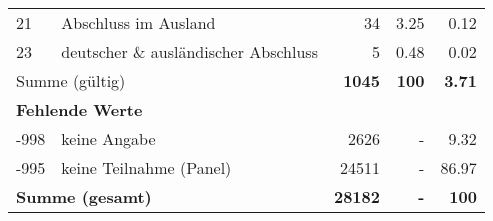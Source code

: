 \begin{longtable}{lXrrr}
     21 &
     \multicolumn{1}{X}{ Abschluss im Ausland   } &


       \num{34} &
       \num[round-mode=places,round-precision=2]{3,25} &
         \num[round-mode=places,round-precision=2]{0,12} \\

     23 &
     \multicolumn{1}{X}{ deutscher \& ausländischer Abschluss   } &


       \num{5} &
       \num[round-mode=places,round-precision=2]{0,48} &
         \num[round-mode=places,round-precision=2]{0,02} \\
     \midrule
     \multicolumn{2}{l}{Summe (gültig)} &
       \textbf{\num{1045}} &
     \textbf{100} &
       \textbf{\num[round-mode=places,round-precision=2]{3,71}} \\
     \multicolumn{5}{l}{\textbf{Fehlende Werte}}\\
       -998 &
       keine Angabe &
         \num{2626} &
        - &
         \num[round-mode=places,round-precision=2]{9,32} \\
       -995 &
       keine Teilnahme (Panel) &
         \num{24511} &
        - &
         \num[round-mode=places,round-precision=2]{86,97} \\
     \midrule
     \multicolumn{2}{l}{\textbf{Summe (gesamt)}} &
          \textbf{\num{28182}} &
        \textbf{-} &
        \textbf{100} \\
     \bottomrule
     \end{longtable}
     
